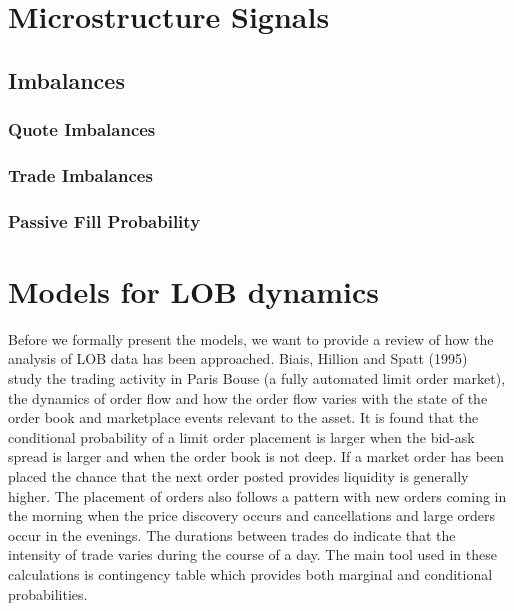 \section{Microstructure Signals}
\subsection{Imbalances}
\subsubsection{Quote Imbalances}
\subsubsection{Trade Imbalances}
\subsubsection{Passive Fill Probability}

\section{Models for LOB dynamics}


Before we formally present the models, we want to provide a review of how the analysis of LOB data has been approached. Biais, Hillion and Spatt (1995)~\cite{spalt} study the trading activity in Paris Bouse (a fully automated limit order market), the dynamics of order flow and how the order flow varies with the state of the order book and marketplace events relevant to the asset. It is found that the conditional probability of a limit order placement is larger when the bid-ask spread is larger and when the order book is not deep. If a market order has been placed the chance that the next order posted provides liquidity is generally higher. The placement of orders also follows a pattern with new orders coming in the morning when the price discovery occurs and cancellations and large orders occur in the evenings. The durations between trades do indicate that the intensity of trade varies during the course of a day. The main tool used in these calculations is contingency table which provides both marginal and conditional probabilities. \\

